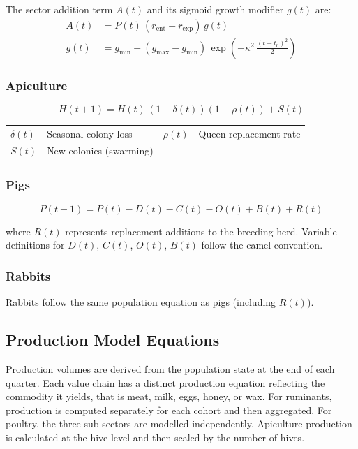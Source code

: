 The sector addition term $A(t)$ and its sigmoid growth modifier $g(t)$ are:
\begin{align}
A(t) &= P(t)\,(r_{\mathrm{ent}} + r_{\mathrm{exp}})\,g(t) \\
g(t) &= g_{\min} + (g_{\max} - g_{\min})\,\exp\!\left(-\kappa^2\,\frac{(t-t_0)^2}{2}\right)
\end{align}

\subsubsection{Apiculture}
\begin{equation}
H(t+1) = H(t)\,(1 - \delta(t))(1 - \rho(t)) + S(t)
\end{equation}

{\small
\begin{tabular}{@{}p{}@{\;}p{}@{\enspace}p{}@{\;}p{}@{}}
$\delta(t)$ & Seasonal colony loss    & $\rho(t)$ & Queen replacement rate \\
$S(t)$      & New colonies (swarming) &           & \\
\end{tabular}}

\subsubsection{Pigs}
\begin{equation}
P(t+1) = P(t) - D(t) - C(t) - O(t) + B(t) + R(t)
\end{equation}

where $R(t)$ represents replacement additions to the breeding herd. Variable definitions for $D(t)$, $C(t)$, $O(t)$, $B(t)$ follow the camel convention.

\subsubsection{Rabbits}

Rabbits follow the same population equation as pigs (including $R(t)$).

\subsection{Production Model Equations}
Production volumes are derived from the population state at the end of each quarter. Each value chain has a distinct production equation reflecting the commodity it yields, that is meat, milk, eggs, honey, or wax.
For ruminants, production is computed separately for each cohort and then aggregated. For poultry, the three sub-sectors are modelled independently. Apiculture production is calculated at the hive level and then scaled by the number of hives.

